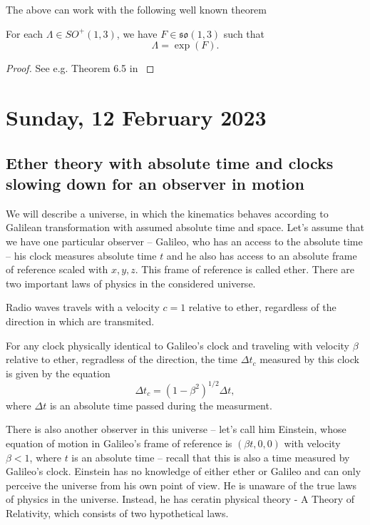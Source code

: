 \documentclass[main.tex]{subfiles}
\begin{document}
The above can work with the following well known theorem
\begin{theorem}
For each $\Lambda\in SO^{+}(1, 3)$, we have $F\in \mathfrak{so}(1,3)$ such that
\begin{equation}
\Lambda = \exp(F).
\end{equation}
\end{theorem}
\begin{proof}
See e.g. Theorem 6.5 in \cite{hall2004}
\end{proof}

\section{Sunday, 12 February 2023}

\subsection{Ether theory with absolute time and clocks slowing down for an observer in motion}

We will describe a universe, in which the kinematics behaves according to Galilean transformation with assumed absolute time and space. Let's assume that we have one particular observer -- Galileo, who has an access to the absolute time -- his clock measures absolute time $t$ and he also has access to an absolute frame of reference scaled with $x, y, z$. This frame of reference is called ether. There are two important laws of physics in the considered universe.

\begin{law}
Radio waves travels with a velocity $c = 1$ relative to ether, regardless of the direction in which are transmited.
\end{law}

\begin{law}
\label{law-of-time-dilatation}
For any clock physically identical to Galileo's clock and traveling with velocity $\beta$ relative to ether, regradless of the direction, the time $\Delta t_c$ measured by this clock is given by the equation
\begin{equation}
\Delta t_c = (1 - \beta^2)^{1/2}\Delta t,
\end{equation} 
where $\Delta t$ is an absolute time passed during the measurment.
\end{law} 

There is also another observer in this universe -- let's call him Einstein, whose equation of motion in Galileo's frame of reference is $(\beta t, 0, 0)$ with velocity $\beta < 1$, where $t$ is an absolute time -- recall that this is also a time measured by Galileo's clock. Einstein has no knowledge of either ether or Galileo and can only perceive the universe from his own point of view. He is unaware of the true laws of physics in the universe. Instead, he has ceratin physical theory - A Theory of Relativity, which consists of two hypothetical laws.
\end{document}
